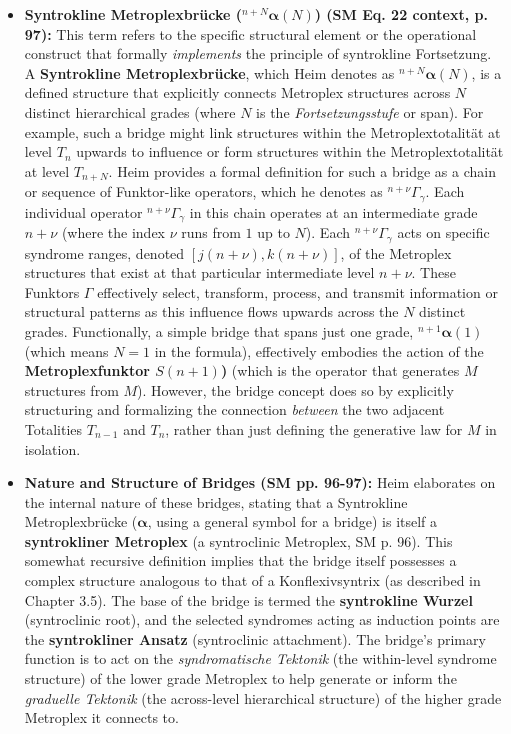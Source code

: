 \documentclass[12pt]{article}
\def\metroplex#1#2{M}%
\newcommand{\metroplextotalitaet}[1]{T_{#1}}
\newcommand{\metroplexfunktor}{S}
\newcommand{\syntroklinebruecke}[1]{{}^{#1}\bm{\alpha}}
\newcommand{\metroplextotalitaetarg}[1]{T_{#1}}
\begin{document}
\begin{itemize}
    \item \textbf{Syntrokline Metroplexbrücke (\( \syntroklinebruecke{n+N}(N) \)) (SM Eq. 22 context, p. 97):}
    This term refers to the specific structural element or the operational construct that formally \textit{implements} the principle of syntrokline Fortsetzung. A \textbf{Syntrokline Metroplexbrücke}, which Heim denotes as \( \syntroklinebruecke{n+N}(N) \), is a defined structure that explicitly connects Metroplex structures across \( N \) distinct hierarchical grades (where \( N \) is the \textit{Fortsetzungsstufe} or span). For example, such a bridge might link structures within the Metroplextotalität at level \( \metroplextotalitaet{n} \) upwards to influence or form structures within the Metroplextotalität at level \( \metroplextotalitaet{n+N} \).
    Heim provides a formal definition for such a bridge as a chain or sequence of Funktor-like operators, which he denotes as \( {}^{n+\nu}\Gamma_\gamma \). Each individual operator \( {}^{n+\nu}\Gamma_\gamma \) in this chain operates at an intermediate grade \( n+\nu \) (where the index \( \nu \) runs from \( 1 \) up to \( N \)). Each \( {}^{n+\nu}\Gamma_\gamma \) acts on specific syndrome ranges, denoted \( [j(n+\nu), k(n+\nu)] \), of the Metroplex structures that exist at that particular intermediate level \( n+\nu \). These Funktors \( \Gamma \) effectively select, transform, process, and transmit information or structural patterns as this influence flows upwards across the \( N \) distinct grades.
    Functionally, a simple bridge that spans just one grade, \( \syntroklinebruecke{n+1}(1) \) (which means \( N=1 \) in the formula), effectively embodies the action of the \textbf{Metroplexfunktor \( \metroplexfunktor(n+1) \))} (which is the operator that generates \( \metroplex{n}{} \) structures from \( \metroplex{n-1}{} \)). However, the bridge concept does so by explicitly structuring and formalizing the connection \textit{between} the two adjacent Totalities \( \metroplextotalitaetarg{n-1} \) and \( \metroplextotalitaetarg{n} \), rather than just defining the generative law for \( \metroplex{n}{} \) in isolation.

    \item \textbf{Nature and Structure of Bridges (SM pp. 96-97):}
    Heim elaborates on the internal nature of these bridges, stating that a Syntrokline Metroplexbrücke (\( \bm{\alpha} \), using a general symbol for a bridge) is itself a \textbf{syntrokliner Metroplex} (a syntroclinic Metroplex, SM p. 96). This somewhat recursive definition implies that the bridge itself possesses a complex structure analogous to that of a Konflexivsyntrix (as described in Chapter 3.5). The base of the bridge is termed the \textbf{syntrokline Wurzel} (syntroclinic root), and the selected syndromes acting as induction points are the \textbf{syntrokliner Ansatz} (syntroclinic attachment). The bridge's primary function is to act on the \textit{syndromatische Tektonik} (the within-level syndrome structure) of the lower grade Metroplex to help generate or inform the \textit{graduelle Tektonik} (the across-level hierarchical structure) of the higher grade Metroplex it connects to.


\end{itemize}
\end{document}
